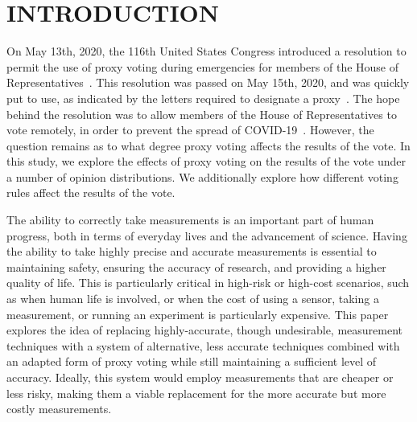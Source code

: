 %
%

\chapter{INTRODUCTION}\label{ch:introduction}
\thispagestyle{empty}

On May 13th, 2020, the 116th United States Congress introduced a resolution
to permit the use of proxy voting during emergencies for members of the House of
Representatives~\cite{Congress.gov2020}.
This resolution was passed on May 15th, 2020, and was quickly put to use, as
indicated by the letters required to designate a proxy~\cite{Clerk.House.gov2020}.
The hope behind the resolution was to allow members of the House of Representatives
to vote remotely, in order to prevent the spread of COVID-19~\cite{Congress.gov2020}.
However, the question remains as to what degree proxy voting affects the results of
the vote.
In this study, we explore the effects of proxy voting on the results of the vote
under a number of opinion distributions.
We additionally explore how different voting rules affect the results of the vote.






The ability to correctly take measurements is an important part of human
progress, both in terms of everyday lives and the advancement of science.
Having the ability to take highly precise and accurate measurements is essential
to maintaining safety, ensuring the accuracy of research, and providing a
higher quality of life.
This is particularly critical in high-risk or high-cost scenarios, such as when
human life is involved, or when the cost of using a sensor, taking a
measurement, or running an experiment is particularly expensive.
This paper explores the idea of replacing highly-accurate, though undesirable,
measurement techniques with a system of alternative, less accurate techniques combined
with an adapted form of proxy voting while still maintaining a sufficient level of
accuracy.
Ideally, this system would employ measurements that are cheaper or less risky, making
them a viable replacement for the more accurate but more costly measurements.

